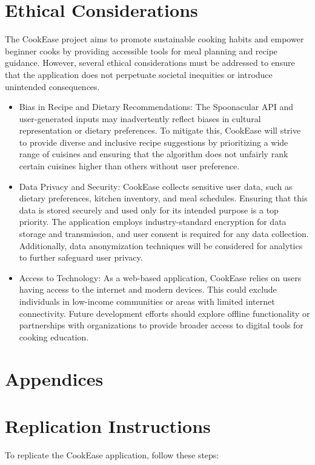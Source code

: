 \documentclass[10pt,twocolumn]{article}
\begin{document}
\section{Ethical Considerations}
The CookEase project aims to promote sustainable cooking habits and empower beginner cooks by providing accessible tools for meal planning and recipe guidance. However, several ethical considerations must be addressed to ensure that the application does not perpetuate societal inequities or introduce unintended consequences.
\begin{itemize}
    \item Bias in Recipe and Dietary Recommendations: 
    The Spoonacular API and user-generated inputs may inadvertently reflect biases in cultural representation or dietary preferences. To mitigate this, CookEase will strive to provide diverse and inclusive recipe suggestions by prioritizing a wide range of cuisines and ensuring that the algorithm does not unfairly rank certain cuisines higher than others without user preference.
    \item Data Privacy and Security:
    CookEase collects sensitive user data, such as dietary preferences, kitchen inventory, and meal schedules. Ensuring that this data is stored securely and used only for its intended purpose is a top priority. The application employs industry-standard encryption for data storage and transmission, and user consent is required for any data collection. Additionally, data anonymization techniques will be considered for analytics to further safeguard user privacy.
    \item Access to Technology: 
    As a web-based application, CookEase relies on users having access to the internet and modern devices. This could exclude individuals in low-income communities or areas with limited internet connectivity. Future development efforts should explore offline functionality or partnerships with organizations to provide broader access to digital tools for cooking education.
\end{itemize}




\section{Appendices}


\appendix

\section{Replication Instructions}
To replicate the CookEase application, follow these steps:
\end{document}
